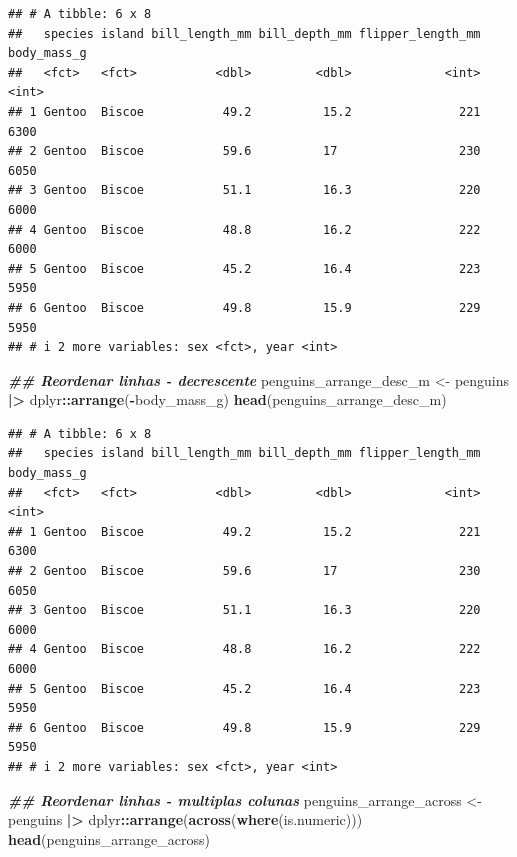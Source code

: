 \documentclass[
]{article}
\newenvironment{Shaded}{\begin{snugshade}}{\end{snugshade}}
\newcommand{\DocumentationTok}[1]{\textcolor[rgb]{0.56,0.35,0.01}{\textbf{\textit{#1}}}}
\newcommand{\FunctionTok}[1]{\textcolor[rgb]{0.13,0.29,0.53}{\textbf{#1}}}
\newcommand{\NormalTok}[1]{#1}
\newcommand{\OtherTok}[1]{\textcolor[rgb]{0.56,0.35,0.01}{#1}}
\newcommand{\SpecialCharTok}[1]{\textcolor[rgb]{0.81,0.36,0.00}{\textbf{#1}}}
\begin{document}
\begin{verbatim}
## # A tibble: 6 x 8
##   species island bill_length_mm bill_depth_mm flipper_length_mm body_mass_g
##   <fct>   <fct>           <dbl>         <dbl>             <int>       <int>
## 1 Gentoo  Biscoe           49.2          15.2               221        6300
## 2 Gentoo  Biscoe           59.6          17                 230        6050
## 3 Gentoo  Biscoe           51.1          16.3               220        6000
## 4 Gentoo  Biscoe           48.8          16.2               222        6000
## 5 Gentoo  Biscoe           45.2          16.4               223        5950
## 6 Gentoo  Biscoe           49.8          15.9               229        5950
## # i 2 more variables: sex <fct>, year <int>
\end{verbatim}

\begin{Shaded}
\begin{Highlighting}[]
\DocumentationTok{\#\# Reordenar linhas {-} decrescente}
\NormalTok{penguins\_arrange\_desc\_m }\OtherTok{\textless{}{-}}\NormalTok{ penguins }\SpecialCharTok{|\textgreater{}} 
\NormalTok{    dplyr}\SpecialCharTok{::}\FunctionTok{arrange}\NormalTok{(}\SpecialCharTok{{-}}\NormalTok{body\_mass\_g)}
\FunctionTok{head}\NormalTok{(penguins\_arrange\_desc\_m)}
\end{Highlighting}
\end{Shaded}

\begin{verbatim}
## # A tibble: 6 x 8
##   species island bill_length_mm bill_depth_mm flipper_length_mm body_mass_g
##   <fct>   <fct>           <dbl>         <dbl>             <int>       <int>
## 1 Gentoo  Biscoe           49.2          15.2               221        6300
## 2 Gentoo  Biscoe           59.6          17                 230        6050
## 3 Gentoo  Biscoe           51.1          16.3               220        6000
## 4 Gentoo  Biscoe           48.8          16.2               222        6000
## 5 Gentoo  Biscoe           45.2          16.4               223        5950
## 6 Gentoo  Biscoe           49.8          15.9               229        5950
## # i 2 more variables: sex <fct>, year <int>
\end{verbatim}

\begin{Shaded}
\begin{Highlighting}[]
\DocumentationTok{\#\# Reordenar linhas {-} multiplas colunas}
\NormalTok{penguins\_arrange\_across }\OtherTok{\textless{}{-}}\NormalTok{ penguins }\SpecialCharTok{|\textgreater{}} 
\NormalTok{    dplyr}\SpecialCharTok{::}\FunctionTok{arrange}\NormalTok{(}\FunctionTok{across}\NormalTok{(}\FunctionTok{where}\NormalTok{(is.numeric)))}
\FunctionTok{head}\NormalTok{(penguins\_arrange\_across)}
\end{Highlighting}
\end{Shaded}
\end{document}
